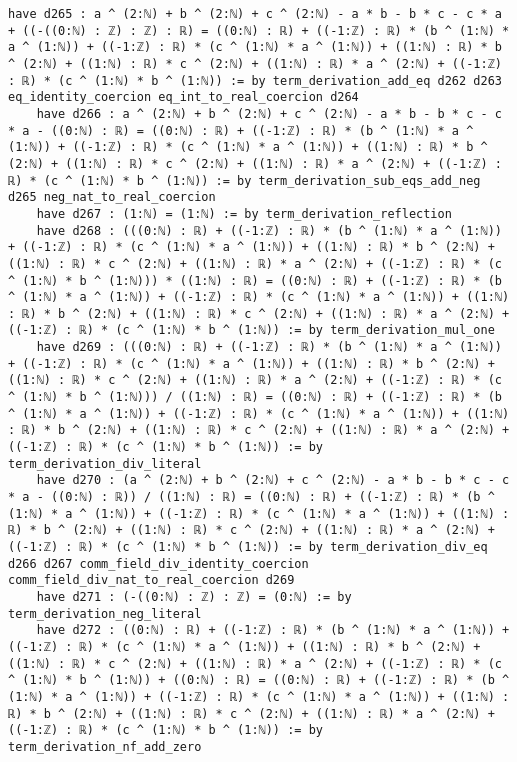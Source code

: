 \documentclass{article}
\begin{document}
\begin{tcolorbox}[colback=white!10, width=\linewidth]
\begin{lstlisting}[language=Lean4]
    have d265 : a ^ (2:ℕ) + b ^ (2:ℕ) + c ^ (2:ℕ) - a * b - b * c - c * a + ((-((0:ℕ) : ℤ) : ℤ) : ℝ) = ((0:ℕ) : ℝ) + ((-1:ℤ) : ℝ) * (b ^ (1:ℕ) * a ^ (1:ℕ)) + ((-1:ℤ) : ℝ) * (c ^ (1:ℕ) * a ^ (1:ℕ)) + ((1:ℕ) : ℝ) * b ^ (2:ℕ) + ((1:ℕ) : ℝ) * c ^ (2:ℕ) + ((1:ℕ) : ℝ) * a ^ (2:ℕ) + ((-1:ℤ) : ℝ) * (c ^ (1:ℕ) * b ^ (1:ℕ)) := by term_derivation_add_eq d262 d263 eq_identity_coercion eq_int_to_real_coercion d264
    have d266 : a ^ (2:ℕ) + b ^ (2:ℕ) + c ^ (2:ℕ) - a * b - b * c - c * a - ((0:ℕ) : ℝ) = ((0:ℕ) : ℝ) + ((-1:ℤ) : ℝ) * (b ^ (1:ℕ) * a ^ (1:ℕ)) + ((-1:ℤ) : ℝ) * (c ^ (1:ℕ) * a ^ (1:ℕ)) + ((1:ℕ) : ℝ) * b ^ (2:ℕ) + ((1:ℕ) : ℝ) * c ^ (2:ℕ) + ((1:ℕ) : ℝ) * a ^ (2:ℕ) + ((-1:ℤ) : ℝ) * (c ^ (1:ℕ) * b ^ (1:ℕ)) := by term_derivation_sub_eqs_add_neg d265 neg_nat_to_real_coercion
    have d267 : (1:ℕ) = (1:ℕ) := by term_derivation_reflection
    have d268 : (((0:ℕ) : ℝ) + ((-1:ℤ) : ℝ) * (b ^ (1:ℕ) * a ^ (1:ℕ)) + ((-1:ℤ) : ℝ) * (c ^ (1:ℕ) * a ^ (1:ℕ)) + ((1:ℕ) : ℝ) * b ^ (2:ℕ) + ((1:ℕ) : ℝ) * c ^ (2:ℕ) + ((1:ℕ) : ℝ) * a ^ (2:ℕ) + ((-1:ℤ) : ℝ) * (c ^ (1:ℕ) * b ^ (1:ℕ))) * ((1:ℕ) : ℝ) = ((0:ℕ) : ℝ) + ((-1:ℤ) : ℝ) * (b ^ (1:ℕ) * a ^ (1:ℕ)) + ((-1:ℤ) : ℝ) * (c ^ (1:ℕ) * a ^ (1:ℕ)) + ((1:ℕ) : ℝ) * b ^ (2:ℕ) + ((1:ℕ) : ℝ) * c ^ (2:ℕ) + ((1:ℕ) : ℝ) * a ^ (2:ℕ) + ((-1:ℤ) : ℝ) * (c ^ (1:ℕ) * b ^ (1:ℕ)) := by term_derivation_mul_one
    have d269 : (((0:ℕ) : ℝ) + ((-1:ℤ) : ℝ) * (b ^ (1:ℕ) * a ^ (1:ℕ)) + ((-1:ℤ) : ℝ) * (c ^ (1:ℕ) * a ^ (1:ℕ)) + ((1:ℕ) : ℝ) * b ^ (2:ℕ) + ((1:ℕ) : ℝ) * c ^ (2:ℕ) + ((1:ℕ) : ℝ) * a ^ (2:ℕ) + ((-1:ℤ) : ℝ) * (c ^ (1:ℕ) * b ^ (1:ℕ))) / ((1:ℕ) : ℝ) = ((0:ℕ) : ℝ) + ((-1:ℤ) : ℝ) * (b ^ (1:ℕ) * a ^ (1:ℕ)) + ((-1:ℤ) : ℝ) * (c ^ (1:ℕ) * a ^ (1:ℕ)) + ((1:ℕ) : ℝ) * b ^ (2:ℕ) + ((1:ℕ) : ℝ) * c ^ (2:ℕ) + ((1:ℕ) : ℝ) * a ^ (2:ℕ) + ((-1:ℤ) : ℝ) * (c ^ (1:ℕ) * b ^ (1:ℕ)) := by term_derivation_div_literal
    have d270 : (a ^ (2:ℕ) + b ^ (2:ℕ) + c ^ (2:ℕ) - a * b - b * c - c * a - ((0:ℕ) : ℝ)) / ((1:ℕ) : ℝ) = ((0:ℕ) : ℝ) + ((-1:ℤ) : ℝ) * (b ^ (1:ℕ) * a ^ (1:ℕ)) + ((-1:ℤ) : ℝ) * (c ^ (1:ℕ) * a ^ (1:ℕ)) + ((1:ℕ) : ℝ) * b ^ (2:ℕ) + ((1:ℕ) : ℝ) * c ^ (2:ℕ) + ((1:ℕ) : ℝ) * a ^ (2:ℕ) + ((-1:ℤ) : ℝ) * (c ^ (1:ℕ) * b ^ (1:ℕ)) := by term_derivation_div_eq d266 d267 comm_field_div_identity_coercion comm_field_div_nat_to_real_coercion d269
    have d271 : (-((0:ℕ) : ℤ) : ℤ) = (0:ℕ) := by term_derivation_neg_literal
    have d272 : ((0:ℕ) : ℝ) + ((-1:ℤ) : ℝ) * (b ^ (1:ℕ) * a ^ (1:ℕ)) + ((-1:ℤ) : ℝ) * (c ^ (1:ℕ) * a ^ (1:ℕ)) + ((1:ℕ) : ℝ) * b ^ (2:ℕ) + ((1:ℕ) : ℝ) * c ^ (2:ℕ) + ((1:ℕ) : ℝ) * a ^ (2:ℕ) + ((-1:ℤ) : ℝ) * (c ^ (1:ℕ) * b ^ (1:ℕ)) + ((0:ℕ) : ℝ) = ((0:ℕ) : ℝ) + ((-1:ℤ) : ℝ) * (b ^ (1:ℕ) * a ^ (1:ℕ)) + ((-1:ℤ) : ℝ) * (c ^ (1:ℕ) * a ^ (1:ℕ)) + ((1:ℕ) : ℝ) * b ^ (2:ℕ) + ((1:ℕ) : ℝ) * c ^ (2:ℕ) + ((1:ℕ) : ℝ) * a ^ (2:ℕ) + ((-1:ℤ) : ℝ) * (c ^ (1:ℕ) * b ^ (1:ℕ)) := by term_derivation_nf_add_zero

\end{lstlisting}
\end{tcolorbox}
\end{document}
